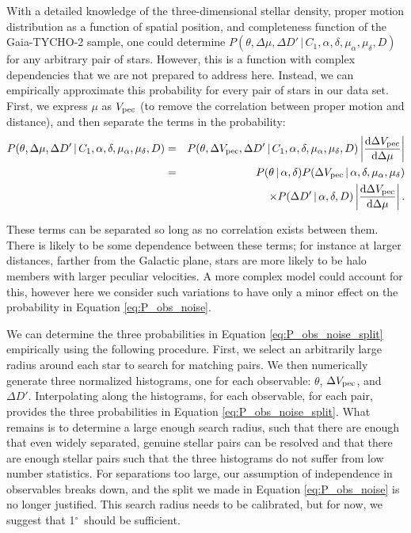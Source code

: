 \documentclass[12pt, preprint]{aastex}
\newcommand{\given}{\,|\,}
\newcommand{\dd}{\mathrm{d}}
\newcommand{\degree}{\ifmmode {^\circ}\else$^\circ$\ \fi}
\begin{document}
With a detailed knowledge of the three-dimensional stellar density, proper motion distribution as a function of spatial position, and completeness function of the Gaia-TYCHO-2 sample, one could determine $P(\theta, \Delta \mu, \Delta D' \given C_1, \alpha, \delta, \mu_{\alpha}, \mu_{\delta}, D )$ for any arbitrary pair of stars. However, this is a function with complex dependencies that we are not prepared to address here. Instead, we can empirically approximate this probability for every pair of stars in our data set. First, we express $\mu$ as $V_{\rm pec}$ (to remove the correlation between proper motion and distance), and then separate the terms in the probability:
\begin{eqnarray}
P(\theta, \Delta \mu, \Delta D' \given C_1, \alpha, \delta, \mu_{\alpha}, \mu_{\delta}, D ) &=& P(\theta, \Delta V_{\rm pec}, \Delta D' \given C_1, \alpha, \delta, \mu_{\alpha}, \mu_{\delta}, D ) \left| \frac{\dd \Delta V_{\rm pec}}{\dd \Delta \mu} \right| \label{eq:P_obs_noise} \\
&=& P(\theta \given \alpha, \delta) 
  P(\Delta V_{\rm pec} \given \alpha, \delta, \mu_{\alpha}, \mu_{\delta}) \nonumber \\
  & & \qquad \times  P(\Delta D' \given \alpha, \delta, D) \left| \frac{\dd \Delta V_{\rm pec}}{\dd \Delta \mu} \right|. \label{eq:P_obs_noise_split} 
\end{eqnarray}

These terms can be separated so long as no correlation exists between them. There is likely to be some dependence between these terms; for instance at larger distances, farther from the Galactic plane, stars are more likely to be halo members with larger peculiar velocities. A more complex model could account for this, however here we consider such variations to have only a minor effect on the probability in Equation \ref{eq:P_obs_noise}. 

We can determine the three probabilities in Equation \ref{eq:P_obs_noise_split} empirically using the following procedure. First, we select an arbitrarily large radius around each star to search for matching pairs. We then numerically generate three normalized histograms, one for each observable: $\theta$, $\Delta V_{\rm pec}$, and $\Delta D'$. Interpolating along the histograms, for each observable, for each pair, provides the three probabilities in Equation \ref{eq:P_obs_noise_split}. What remains is to determine a large enough search radius, such that there are enough that even widely separated, genuine stellar pairs can be resolved and that there are enough stellar pairs such that the three histograms do not suffer from low number statistics. For separations too large, our assumption of independence in observables breaks down, and the split we made in Equation \ref{eq:P_obs_noise} is no longer justified. This search radius needs to be calibrated, but for now, we suggest that 1\degree should be sufficient.
\end{document}
